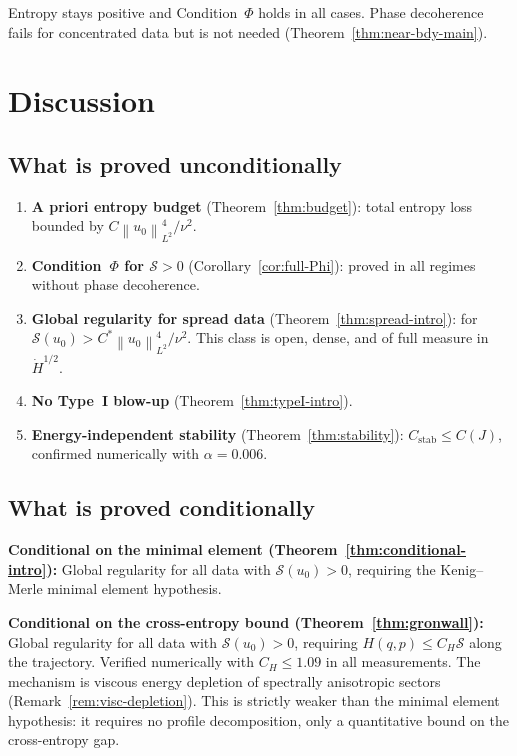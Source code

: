 \documentclass[11pt]{article}
\theoremstyle{definition}
\newcommand{\norm}[1]{\left\| #1 \right\|}
\newcommand{\Hdot}[1]{\dot{H}^{#1}}
\newcommand{\cS}{\mathcal{S}}
\begin{document}
Entropy stays positive and Condition~$\Phi$ holds in all
cases.  Phase decoherence fails for concentrated data but
is not needed (Theorem~\ref{thm:near-bdy-main}).


\section{Discussion}\label{sec:discussion}

\subsection{What is proved unconditionally}

\begin{enumerate}[label=(\roman*)]
\item \textbf{A priori entropy budget}
(Theorem~\ref{thm:budget}): total entropy loss bounded
by $C\norm{u_0}_{L^2}^4/\nu^2$.
\item \textbf{Condition~$\Phi$ for $\cS > 0$}
(Corollary~\ref{cor:full-Phi}): proved in all regimes
without phase decoherence.
\item \textbf{Global regularity for spread data}
(Theorem~\ref{thm:spread-intro}): for
$\cS(u_0) > C^*\norm{u_0}_{L^2}^4/\nu^2$.
This class is open, dense, and of full measure in
$\Hdot{1/2}$.
\item \textbf{No Type~I blow-up}
(Theorem~\ref{thm:typeI-intro}).
\item \textbf{Energy-independent stability}
(Theorem~\ref{thm:stability}): $C_{\mathrm{stab}} \leq C(J)$,
confirmed numerically with $\alpha = 0.006$.
\end{enumerate}


\subsection{What is proved conditionally}

\textbf{Conditional on the minimal element
(Theorem~\ref{thm:conditional-intro}):}
Global regularity for all data with $\cS(u_0) > 0$,
requiring the Kenig--Merle minimal element hypothesis.

\textbf{Conditional on the cross-entropy bound
(Theorem~\ref{thm:gronwall}):}
Global regularity for all data with $\cS(u_0) > 0$,
requiring $H(q,p) \leq C_H\cS$ along the trajectory.
Verified numerically with $C_H \leq 1.09$ in all
measurements.  The mechanism is viscous energy depletion
of spectrally anisotropic sectors
(Remark~\ref{rem:visc-depletion}).
This is strictly weaker than the minimal element
hypothesis: it requires no profile decomposition,
only a quantitative bound on the cross-entropy gap.
\end{document}
